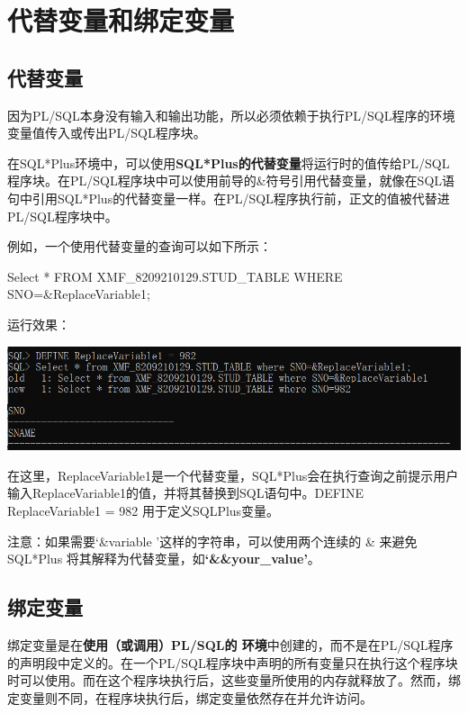 \documentclass[11pt, a4paper, oneside, UTF8]{ctexbook}
\let\kaishu\relax %
\begin{document}
\section{代替变量和绑定变量}
\subsection{代替变量}
因为PL/SQL本身没有输入和输出功能，所以必须依赖于执行PL/SQL程序的环境变量值传入或传出PL/SQL程序块。

在SQL*Plus环境中，可以使用{\bfseries\kaishu SQL*Plus的代替变量}将运行时的值传给PL/SQL程序块。在PL/SQL程序块中可以使用前导的\&符号引用代替变量，就像在SQL语句中引用SQL*Plus的代替变量一样。在PL/SQL程序执行前，正文的值被代替进PL/SQL程序块中。

例如，一个使用代替变量的查询可以如下所示：
\begin{plsql}[]
Select * 
FROM XMF_8209210129.STUD_TABLE 
WHERE SNO=&ReplaceVariable1;
\end{plsql}

运行效果：
\begin{center}
  \begin{minipage}{\textwidth}
    \center
    \includegraphics[width=\textwidth]{picture/代替变量案例.png}
    \captionsetup{hypcap=false}
    \label{fig:代替变量案例}
  \end{minipage}
\end{center}


在这里，ReplaceVariable1是一个代替变量，SQL*Plus会在执行查询之前提示用户输入ReplaceVariable1的值，并将其替换到SQL语句中。DEFINE ReplaceVariable1 = 982 用于定义SQLPlus变量。

注意：如果需要`\&variable '这样的字符串，可以使用两个连续的 \& 来避免 SQL*Plus 将其解释为代替变量，如\textbf{`\&\&your\_value'}。
\subsection{绑定变量}
绑定变量是在{\bfseries\kaishu 使用（或调用）PL/SQL的 环境}中创建的，而不是在PL/SQL程序的声明段中定义的。在一个PL/SQL程序块中声明的所有变量只在执行这个程序块时可以使用。而在这个程序块执行后，这些变量所使用的内存就释放了。然而，绑定变量则不同，在程序块执行后，绑定变量依然存在并允许访问。
\end{document}
